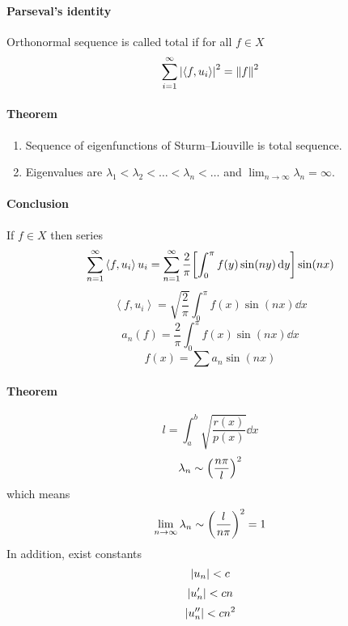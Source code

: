 \paragraph{Parseval's identity}
Orthonormal sequence is called total if for all $f\in X$ 
$$\sum_{i=1}^\infty \abs{\left\langle  f,u_i\right\rangle}^2 = \norm{f}^2$$
\paragraph{Theorem}
\begin{enumerate}
	\item Sequence of eigenfunctions of  Sturm–Liouville is total sequence.
	\item Eigenvalues are $\lambda_1 < \lambda_2 < \dots < \lambda_n < \dots$ and $\lim_{n\to \infty} \lambda_n = \infty$.
\end{enumerate}
\paragraph{Conclusion}
If $f\in X$ then series 
$$\sum_{n=1}^{\infty} \left\langle  f,u_i\right\rangle u_i = \sum_{n=1}^\infty \frac{2}{\pi} \qty[\int_0^\pi f(y) \sin(ny) \dd{y}] \sin(nx)$$ 
$$\left\langle  f,u_i\right\rangle = \sqrt{\frac{2}{\pi}} \int_0^\pi f(x) \sin(nx) \dd{x}$$
$$a_n(f) = \frac{2}{\pi } \int_0^\pi f(x) \sin(nx) \dd{x}$$
$$f(x) = \sum a_n \sin(n x)$$
\paragraph{Theorem} 
$$l = \int_a^b \sqrt{\frac{r(x)}{p(x)}} \dd{x}$$
$$\lambda_n \sim \qty(\frac{n\pi}{l})^2$$
which means
$$\lim_{n\to \infty} \lambda_n \sim \qty(\frac{l}{n\pi})^2 = 1$$
In addition, exist constants
$$\abs{u_n}<c$$
$$\abs{u'_n}<cn$$
$$\abs{u''_n}<cn^2$$
